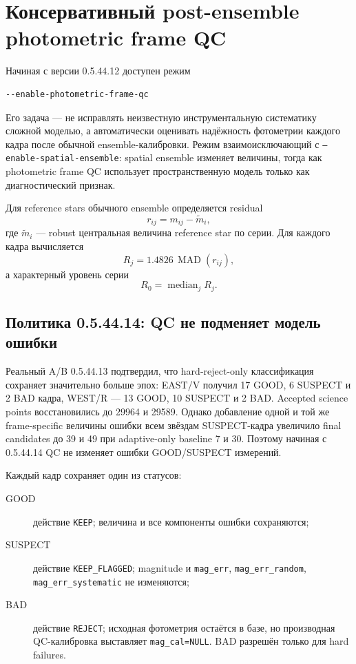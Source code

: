 \section{Консервативный post-ensemble photometric frame QC}
\label{sec:photometric-frame-qc}

Начиная с версии 0.5.44.12 доступен режим
\begin{lstlisting}
--enable-photometric-frame-qc
\end{lstlisting}
Его задача --- не исправлять неизвестную инструментальную систематику сложной моделью, а автоматически
оценивать надёжность фотометрии каждого кадра после обычной ensemble-калибровки. Режим взаимоисключающий
с \texttt{--enable-spatial-ensemble}: spatial ensemble изменяет величины, тогда как photometric frame QC
использует пространственную модель только как диагностический признак.

Для reference stars обычного ensemble определяется residual
\begin{equation}
 r_{ij}=m_{ij}-\widetilde m_i,
\end{equation}
где $\widetilde m_i$ --- robust центральная величина reference star по серии. Для каждого кадра
вычисляется
\begin{equation}
 R_j=1.4826\,\operatorname{MAD}(r_{ij}),
\end{equation}
а характерный уровень серии
\begin{equation}
 R_0=\operatorname{median}_j R_j.
\end{equation}

\subsection{Политика 0.5.44.14: QC не подменяет модель ошибки}

Реальный A/B 0.5.44.13 подтвердил, что hard-reject-only классификация сохраняет значительно больше
эпох: EAST/V получил 17 GOOD, 6 SUSPECT и 2 BAD кадра, WEST/R --- 13 GOOD, 10 SUSPECT и 2 BAD.
Accepted science points восстановились до 29964 и 29589. Однако добавление одной и той же
frame-specific величины ошибки всем звёздам SUSPECT-кадра увеличило final candidates до 39 и 49
при adaptive-only baseline 7 и 30. Поэтому начиная с 0.5.44.14 QC не изменяет ошибки GOOD/SUSPECT
измерений.

Каждый кадр сохраняет один из статусов:
\begin{description}
  \item[GOOD] действие \texttt{KEEP}; величина и все компоненты ошибки сохраняются;
  \item[SUSPECT] действие \texttt{KEEP\_FLAGGED}; magnitude и
  \texttt{mag\_err}, \texttt{mag\_err\_random}, \texttt{mag\_err\_systematic} не изменяются;
  \item[BAD] действие \texttt{REJECT}; исходная фотометрия остаётся в базе, но производная QC-калибровка
  выставляет \texttt{mag\_cal=NULL}. BAD разрешён только для hard failures.
\end{description}


